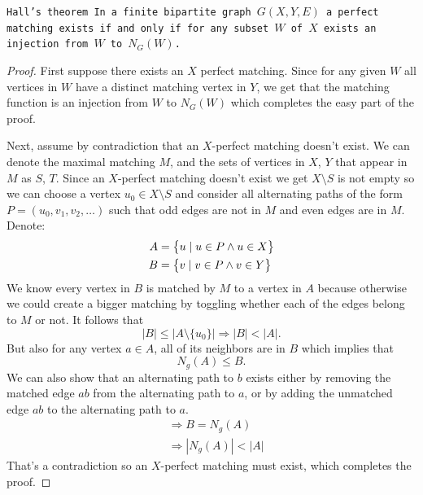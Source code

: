 \documentclass[11pt,a4paper]{article}
\begin{document}
	\begin{theorem}\tt{Hall's theorem}
    In a finite bipartite graph $G(X,Y,E)$ 
    a perfect matching exists if and only if for any subset $W$ of $X$ 
    exists an injection from $W$ to $N_G(W)$.
	\end{theorem}
  \begin{proof}
	First suppose there exists an $X$ perfect matching.
  Since for any given $W$ all vertices in $W$ have a distinct matching 
  vertex in $Y$,
	we get that the matching function is an injection from $W$ to $N_G(W)$
  which completes the easy part of the proof.
	
	Next, assume by contradiction that an $X$-perfect matching doesn't exist.
  We can denote the maximal matching $M$, and the sets of vertices 
	in $X$, $Y$ that appear in $M$ as $S$, $T$.
	Since an $X$-perfect matching doesn't exist we get $X \setminus S$ is
  not empty
	so we can choose a vertex $u_0 \in X \setminus S$ and consider all 
	alternating paths of the form $P=(u_0,v_1,v_2,\ldots)$ such that 
	odd edges are not in $M$ and even edges are in $M$.
	Denote:
	\begin{align*}
		A &= \set{u \mid u \in P \land u \in X} \\
		B &= \set{v \mid v \in P \land v \in Y}
	\end{align*}
	We know every vertex in $B$ is matched by $M$ to a vertex in $A$ 
	because otherwise we could create a bigger matching by toggling 
	whether each of the edges belong to $M$ or not.
  It follows that
	\[
		|B| \le |A \setminus \{u_0\}| \Rightarrow |B| < |A|.
	\]
	But also for any vertex $a \in A$, all of its neighbors are in $B$ which
	implies that
	\[
		N_g(A) \le B.
	\]
	We can also show that an alternating path to $b$ exists either by removing 
	the matched edge $ab$ from the alternating path to $a$, or by adding 
	the unmatched edge $ab$ to the alternating path to $a$.
	\begin{align*}
		&\Rightarrow B = N_g(A) \\ 
		&\Rightarrow |N_g(A)|<|A|
	\end{align*}
	That's a contradiction so an $X$-perfect matching must exist, which completes
  the proof.
  \end{proof}

	\newpage
\end{document}
